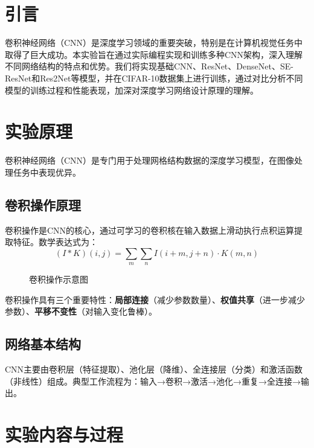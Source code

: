 \documentclass[12pt,a4paper]{article}
\begin{document}
\section{引言}
卷积神经网络（CNN）是深度学习领域的重要突破，特别是在计算机视觉任务中取得了巨大成功。本实验旨在通过实际编程实现和训练多种CNN架构，深入理解不同网络结构的特点和优势。我们将实现基础CNN、ResNet、DenseNet、SE-ResNet和Res2Net等模型，并在CIFAR-10数据集上进行训练，通过对比分析不同模型的训练过程和性能表现，加深对深度学习网络设计原理的理解。

\section{实验原理}
卷积神经网络（CNN）是专门用于处理网格结构数据的深度学习模型，在图像处理任务中表现优异\cite{lecun1998gradient}。

\subsection{卷积操作原理}
卷积操作是CNN的核心，通过可学习的卷积核在输入数据上滑动执行点积运算提取特征。数学表达式为：
\begin{equation}
    (I * K)(i, j) = \sum_{m}\sum_{n} I(i+m, j+n) \cdot K(m, n)
\end{equation}

\begin{figure}[H]
    \centering
    \caption{卷积操作示意图}
    \label{fig:convolution}
\end{figure}

卷积操作具有三个重要特性：\textbf{局部连接}（减少参数数量）、\textbf{权值共享}（进一步减少参数）、\textbf{平移不变性}（对输入变化鲁棒）。

\subsection{网络基本结构}
CNN主要由卷积层（特征提取）、池化层（降维）、全连接层（分类）和激活函数（非线性）组成。典型工作流程为：输入→卷积→激活→池化→重复→全连接→输出。

\section{实验内容与过程}
\end{document}
